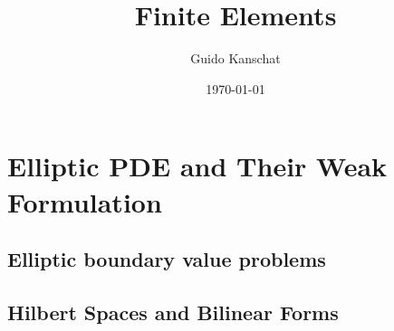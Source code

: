 \documentclass[american,ignorenonframetext,notheorems,aspectratio=1610]{beamer}
\title{Finite Elements}
\author{Guido Kanschat}
\date{\today}
\begin{document}
\frame{\maketitle}
\section{Elliptic PDE and Their Weak Formulation}
\frame{\sectoc}
\subsection{Elliptic boundary value problems}

\frame {}
\frame {}
\frame {
  }
\frame {}
\frame {}
\frame {}
\frame {}
\frame {}
\frame {
  }
\frame {}
\frame {}
\frame {
  }
\frame {}
\frame {
  }
\frame {
  }
\frame {
  }

\frame {}
\frame {}
\frame {}

\subsection{Hilbert Spaces and Bilinear Forms}
\frame{\tableofcontents[currentsection,subsectionstyle=show/shaded/hide]}

\frame {}
\frame {
  }
\frame {}
\frame {}
\frame {}
\frame {}
\frame {}
\frame {}
\frame {}
\frame {}
\frame {}
\frame {}
\frame {}
\frame {}
\frame {
  }
\end{document}
